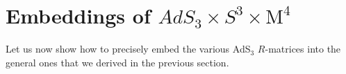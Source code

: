 \documentclass[12pt,a4paper]{article}
\numberwithin{equation}{section}
\newcommand{\comA}[1]{{\bf\textcolor{blue} {Ana:} \textcolor{blue}{#1}}}
\newcommand{\mdlnote}[1]{$\framebox{\tiny MdL}$\ \textbf{\texttt{{\color{blue}\footnotesize#1}}}}
\begin{document}
\iffalse
\paragraph{Matching to AdS$_{3}$}

We now write the explicit map between the entries of the 8VB $R$-matrix and the AdS$_{3}$ one. 

We parameterise the $R$-matrix using the two particle momenta $p$ and $q$. 

\begin{equation}
\eta_{{\rm L}}(p)=-p
\end{equation}
\begin{equation}
h(p)=\frac{i}{4}\log\left(x^+_p x^-_p\right)
\end{equation}
\begin{equation}
g_{{\rm L}}(p)=e^{i\frac{p}{2}}\frac{x^+_p-x^-_p}{\gamma_p^2}
\end{equation}

\mdlnote{Mention that mixed 6v-8v is not possible?}

\comA{Shouldn't we move this "matching" part to the next section?}


\fi

\section{Embeddings of $ AdS_3 \times S^{3} \times \mathrm{M}^{4} $}\label{Comparison}


Let us now show how to precisely embed the various AdS$_3$ $R$-matrices into the general ones that we derived in the previous section.
\end{document}

